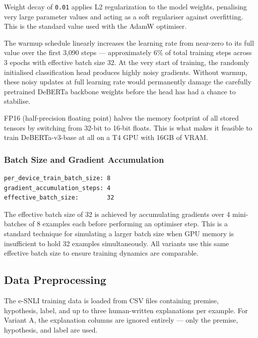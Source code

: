 Weight decay of \texttt{0.01} applies L2 regularization to the model
weights, penalising very large parameter values and acting as a soft
regulariser against overfitting. This is the standard value used with
the AdamW optimiser.

The warmup schedule linearly increases the learning rate from near-zero
to its full value over the first 3,090 steps --- approximately 6\% of
total training steps across 3 epochs with effective batch size 32. At
the very start of training, the randomly initialised classification
head produces highly noisy gradients. Without warmup, these noisy
updates at full learning rate would permanently damage the carefully
pretrained DeBERTa backbone weights before the head has had a chance to
stabilise.

FP16 (half-precision floating point) halves the memory footprint of all
stored tensors by switching from 32-bit to 16-bit floats. This is what
makes it feasible to train DeBERTa-v3-base at all on a T4 GPU with
16GB of VRAM.

\subsubsection{Batch Size and Gradient Accumulation}

\begin{verbatim}
per_device_train_batch_size: 8
gradient_accumulation_steps: 4
effective_batch_size:        32
\end{verbatim}

The effective batch size of 32 is achieved by accumulating gradients
over 4 mini-batches of 8 examples each before performing an optimiser
step. This is a standard technique for simulating a larger batch size
when GPU memory is insufficient to hold 32 examples simultaneously. All
variants use this same effective batch size to ensure training dynamics
are comparable.

\subsection{Data Preprocessing}

The e-SNLI training data is loaded from CSV files containing premise,
hypothesis, label, and up to three human-written explanations per
example. For Variant A, the explanation columns are ignored entirely
--- only the premise, hypothesis, and label are used.

